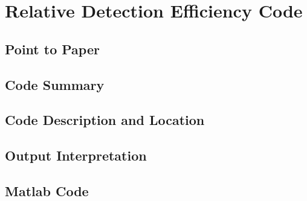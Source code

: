 \section{Relative Detection Efficiency Code}

\subsection{Point to Paper}

\subsection{Code Summary}

\subsection{Code Description and Location}

\subsection{Output Interpretation}

\subsection{Matlab Code}